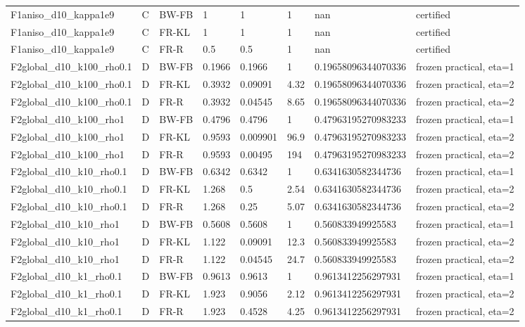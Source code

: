\begin{tabular}{llllllll}
F1aniso\_d10\_kappa1e9 & C & BW-FB & 1 & 1 & 1 & nan & certified \\
F1aniso\_d10\_kappa1e9 & C & FR-KL & 1 & 1 & 1 & nan & certified \\
F1aniso\_d10\_kappa1e9 & C & FR-R & 0.5 & 0.5 & 1 & nan & certified \\
F2global\_d10\_k100\_rho0.1 & D & BW-FB & 0.1966 & 0.1966 & 1 & 0.19658096344070336 & frozen practical, eta=1 \\
F2global\_d10\_k100\_rho0.1 & D & FR-KL & 0.3932 & 0.09091 & 4.32 & 0.19658096344070336 & frozen practical, eta=2 \\
F2global\_d10\_k100\_rho0.1 & D & FR-R & 0.3932 & 0.04545 & 8.65 & 0.19658096344070336 & frozen practical, eta=2 \\
F2global\_d10\_k100\_rho1 & D & BW-FB & 0.4796 & 0.4796 & 1 & 0.47963195270983233 & frozen practical, eta=1 \\
F2global\_d10\_k100\_rho1 & D & FR-KL & 0.9593 & 0.009901 & 96.9 & 0.47963195270983233 & frozen practical, eta=2 \\
F2global\_d10\_k100\_rho1 & D & FR-R & 0.9593 & 0.00495 & 194 & 0.47963195270983233 & frozen practical, eta=2 \\
F2global\_d10\_k10\_rho0.1 & D & BW-FB & 0.6342 & 0.6342 & 1 & 0.6341630582344736 & frozen practical, eta=1 \\
F2global\_d10\_k10\_rho0.1 & D & FR-KL & 1.268 & 0.5 & 2.54 & 0.6341630582344736 & frozen practical, eta=2 \\
F2global\_d10\_k10\_rho0.1 & D & FR-R & 1.268 & 0.25 & 5.07 & 0.6341630582344736 & frozen practical, eta=2 \\
F2global\_d10\_k10\_rho1 & D & BW-FB & 0.5608 & 0.5608 & 1 & 0.560833949925583 & frozen practical, eta=1 \\
F2global\_d10\_k10\_rho1 & D & FR-KL & 1.122 & 0.09091 & 12.3 & 0.560833949925583 & frozen practical, eta=2 \\
F2global\_d10\_k10\_rho1 & D & FR-R & 1.122 & 0.04545 & 24.7 & 0.560833949925583 & frozen practical, eta=2 \\
F2global\_d10\_k1\_rho0.1 & D & BW-FB & 0.9613 & 0.9613 & 1 & 0.9613412256297931 & frozen practical, eta=1 \\
F2global\_d10\_k1\_rho0.1 & D & FR-KL & 1.923 & 0.9056 & 2.12 & 0.9613412256297931 & frozen practical, eta=2 \\
F2global\_d10\_k1\_rho0.1 & D & FR-R & 1.923 & 0.4528 & 4.25 & 0.9613412256297931 & frozen practical, eta=2 \\

\end{tabular}
